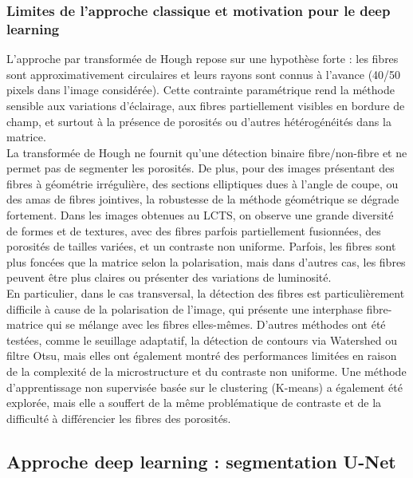\documentclass[a4paper,11pt]{article}
\begin{document}
\subsubsection{Limites de l'approche classique et motivation pour le deep learning}

L'approche par transformée de Hough repose sur une hypothèse forte : les fibres sont approximativement circulaires et leurs rayons sont connus à l'avance (40/50 pixels dans l'image considérée). Cette contrainte paramétrique rend la méthode sensible aux variations d'éclairage, aux fibres partiellement visibles en bordure de champ, et surtout à la présence de porosités ou d'autres hétérogénéités dans la matrice. \\

La transformée de Hough ne fournit qu'une détection binaire fibre/non-fibre et ne permet pas de segmenter les porosités. De plus, pour des images présentant des fibres à géométrie irrégulière, des sections elliptiques dues à l'angle de coupe, ou des amas de fibres jointives, la robustesse de la méthode géométrique se dégrade fortement. Dans les images obtenues au LCTS, on observe une grande diversité de formes et de textures, avec des fibres parfois partiellement fusionnées, des porosités de tailles variées, et un contraste non uniforme. Parfois, les fibres sont plus foncées que la matrice selon la polarisation, mais dans d'autres cas, les fibres peuvent être plus claires ou présenter des variations de luminosité. \\

En particulier, dans le cas transversal, la détection des fibres est particulièrement difficile à cause de la polarisation de l'image, qui présente une interphase fibre-matrice qui se mélange avec les fibres elles-mêmes. D'autres méthodes ont été testées, comme le seuillage adaptatif, la détection de contours via Watershed ou filtre Otsu, mais elles ont également montré des performances limitées en raison de la complexité de la microstructure et du contraste non uniforme. Une méthode d'apprentissage non supervisée basée sur le clustering (K-means) a également été explorée, mais elle a souffert de la même problématique de contraste et de la difficulté à différencier les fibres des porosités.

\subsection{Approche deep learning : segmentation U-Net}
\label{subsubsec:unet}
\end{document}
